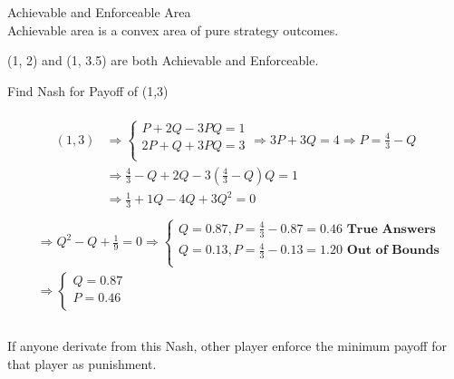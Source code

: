 \documentclass[
  course = {{IE579 Game Theory and Multi-Agent Reinforcement Learning}},
  quartile = {{4}},
  assignment = 2,
  name = {{Mohammad Mahdi Rahimi}},
  studentnumber = {{20208244}},
  email = {{mahi@kaist.ac.kr}},
  firstexercise = 1
]{aga-homework}
\begin{document}
\subexercise Achievable and Enforceable Area\\
Achievable area is a convex area of pure strategy outcomes.
\begin{center}
\end{center}
(1, 2) and (1, 3.5) are both Achievable and Enforceable.

\subexercise Find Nash for Payoff of (1,3)
\\\\
\begin{equation} \label{eq1}
\begin{split}
(1,3) & \Rightarrow \begin{cases}
      P + 2Q - 3PQ = 1\\
      2P + Q + 3PQ = 3\\
     \end{cases} \Rightarrow 3P + 3Q = 4 \Rightarrow P = \frac{4}{3} - Q \\
& \Rightarrow \frac{4}{3} - Q + 2Q - 3(\frac{4}{3} - Q)Q = 1 \\
& \Rightarrow \frac{1}{3} + 1Q - 4Q + 3Q^2 = 0 \\
\end{split}
\end{equation}
\begin{equation} \label{eq1}
\begin{split}
& \Rightarrow Q^2 - Q + \frac{1}{9} = 0 \Rightarrow \begin{cases}
      Q = 0.87, P = \frac{4}{3} - 0.87 = 0.46 \textbf{ True Answers}\\
      Q = 0.13, P = \frac{4}{3} - 0.13 = 1.20 \textbf{ Out of Bounds}\\
     \end{cases}\\
& \Rightarrow \begin{cases}
      Q = 0.87\\
      P = 0.46\\
     \end{cases}\\
\end{split}
\end{equation}\\
If anyone derivate from this Nash, other player enforce the minimum payoff for that player as punishment.
\end{document}

